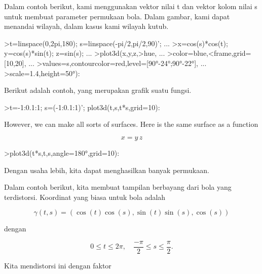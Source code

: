 \documentclass[a4paper,10pt]{article}
\begin{document}
\begin{eulernotebook}
\begin{eulercomment}
\begin{eulercomment}
\begin{eulercomment}
\begin{eulercomment}
\begin{eulercomment}
\begin{eulercomment}
\begin{eulercomment}
\begin{eulercomment}
\begin{eulercomment}
\begin{eulercomment}
\begin{eulercomment}
\begin{eulercomment}
\begin{eulercomment}
\begin{eulercomment}
\begin{eulercomment}
\begin{eulercomment}
\begin{eulercomment}
Dalam contoh berikut, kami menggunakan vektor nilai t dan vektor kolom
nilai s untuk membuat parameter permukaan bola. Dalam gambar, kami
dapat menandai wilayah, dalam kasus kami wilayah kutub.
\end{eulercomment}
\begin{eulerprompt}
>t=linspace(0,2pi,180); s=linspace(-pi/2,pi/2,90)'; ...
>x=cos(s)*cos(t); y=cos(s)*sin(t); z=sin(s); ...
>plot3d(x,y,z,>hue, ...
>color=blue,<frame,grid=[10,20], ...
>values=s,contourcolor=red,level=[90°-24°;90°-22°], ...
>scale=1.4,height=50°):
\end{eulerprompt}
\begin{eulercomment}
Berikut adalah contoh, yang merupakan grafik suatu fungsi.
\end{eulercomment}
\begin{eulerprompt}
>t=-1:0.1:1; s=(-1:0.1:1)'; plot3d(t,s,t*s,grid=10):
\end{eulerprompt}
\begin{eulercomment}
However, we can make all sorts of surfaces. Here is the same surface
as a function

\end{eulercomment}
\begin{eulerformula}
\[
x = y \, z
\]
\end{eulerformula}
\begin{eulerprompt}
>plot3d(t*s,t,s,angle=180°,grid=10):
\end{eulerprompt}
\begin{eulercomment}
Dengan usaha lebih, kita dapat menghasilkan banyak permukaan.

Dalam contoh berikut, kita membuat tampilan berbayang dari bola yang
terdistorsi. Koordinat yang biasa untuk bola adalah

\end{eulercomment}
\begin{eulerformula}
\[
\gamma(t,s) = (\cos(t)\cos(s),\sin(t)\sin(s),\cos(s))
\]
\end{eulerformula}
\begin{eulercomment}
dengan

\end{eulercomment}
\begin{eulerformula}
\[
0 \le t \le 2\pi, \quad \frac{-\pi}{2} \le s \le \frac{\pi}{2}.
\]
\end{eulerformula}
\begin{eulercomment}
Kita mendistorsi ini dengan faktor


\end{eulercomment}
\end{eulercomment}
\end{eulercomment}
\end{eulercomment}
\end{eulercomment}
\end{eulercomment}
\end{eulercomment}
\end{eulercomment}
\end{eulercomment}
\end{eulercomment}
\end{eulercomment}
\end{eulercomment}
\end{eulercomment}
\end{eulercomment}
\end{eulercomment}
\end{eulercomment}
\end{eulercomment}
\end{eulernotebook}
\end{document}
